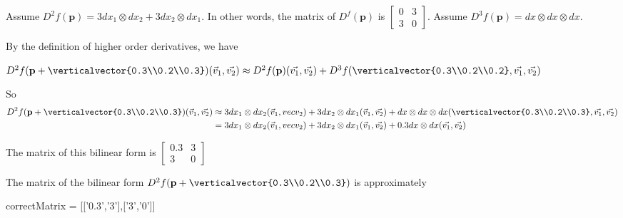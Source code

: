 \documentclass{ximera}
\begin{document}
\begin{question}
	Assume \(D^2f(\mathbf{p}) = 3dx_1\otimes dx_2 + 3dx_2 \otimes dx_1\).  In other words, the matrix of $D^f(\mathbf{p})$ is 
	\(\begin{bmatrix} 0 & 3\\ 3&0 \end{bmatrix}\).  Assume $D^3f(\mathbf{p}) = dx \otimes dx \otimes dx$.
	\begin{solution}
		\begin{hint}
			By the definition of higher order derivatives, we have
			
			\(
				D^2f(\mathbf{p}+\verticalvector{0.3\\0.2\\0.3})(\vec{v}_1,\vec{v_2}) \approx D^2f(\mathbf{p})(\vec{v_1},\vec{v_2}) + D^3f(\verticalvector{0.3\\0.2\\0.2},\vec{v_1},\vec{v_2})
			\)
			
			
		\end{hint}
		\begin{hint}
			So 
			\begin{align*}
			D^2f(\mathbf{p}+\verticalvector{0.3\\0.2\\0.3})(\vec{v}_1,\vec{v_2}) &\approx 
				3dx_1\otimes dx_2(\vec{v}_1,vec{v}_2) + 3dx_2 \otimes dx_1 (\vec{v}_1,\vec{v_2}) + dx \otimes dx \otimes dx (\verticalvector{0.3\\0.2\\0.3},\vec{v_1},\vec{v_2})\\
					&=3dx_1\otimes dx_2(\vec{v}_1,vec{v}_2) + 3dx_2 \otimes dx_1 (\vec{v}_1,\vec{v_2})  + 0.3 dx \otimes dx (\vec{v_1},\vec{v_2})
			\end{align*}
		\end{hint}
	\begin{hint}
		The matrix of this bilinear form is \(\begin{bmatrix} 0.3 & 3\\3&0\end{bmatrix}\)
	\end{hint}
		The matrix of the bilinear form $D^2f(\mathbf{p}+\verticalvector{0.3\\0.2\\0.3})$ is approximately
		\begin{matrix-answer}
			correctMatrix = [['0.3','3'],['3','0']]
		\end{matrix-answer}
	\end{solution}
\end{question}
\end{document}
